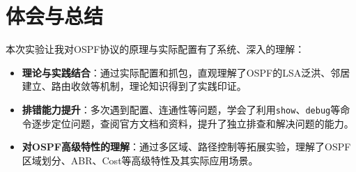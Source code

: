 \documentclass[a4paper]{article}
\begin{document}
\section{体会与总结}

本次实验让我对OSPF协议的原理与实际配置有了系统、深入的理解：

\begin{itemize}
    \item \textbf{理论与实践结合}：通过实际配置和抓包，直观理解了OSPF的LSA泛洪、邻居建立、路由收敛等机制，理论知识得到了实践印证。
    \item \textbf{排错能力提升}：多次遇到配置、连通性等问题，学会了利用\texttt{show}、\texttt{debug}等命令逐步定位问题，查阅官方文档和资料，提升了独立排查和解决问题的能力。
    \item \textbf{对OSPF高级特性的理解}：通过多区域、路径控制等拓展实验，理解了OSPF区域划分、ABR、Cost等高级特性及其实际应用场景。
\end{itemize}
\end{document}
